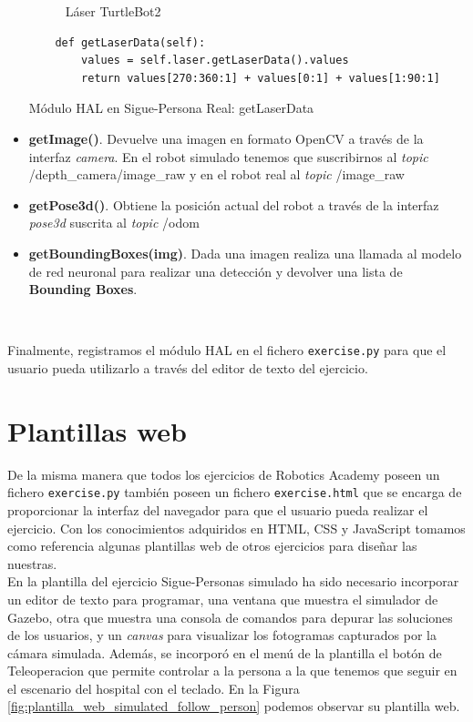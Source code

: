 \begin{itemize}
\begin{figure} [H]
\begin{center}
  \end{center}
  \caption[Láser TurtleBot2]{Láser TurtleBot2}
  \label{fig:vista_planta_turtlebot2}
\end{figure}
\begin{code}[H]
	\begin{lstlisting}
	def getLaserData(self):
		values = self.laser.getLaserData().values
		return values[270:360:1] + values[0:1] + values[1:90:1]
	\end{lstlisting}
	\caption{Módulo HAL en Sigue-Persona Real: getLaserData}
	\label{cod:real_follow_person_hal_laser}
\end{code}
	\item \textbf{getImage()}. Devuelve una imagen en formato OpenCV a través de la interfaz \textit{camera}. En el robot simulado tenemos que suscribirnos al \textit{topic} /depth\_camera/image\_raw y en el robot real al \textit{topic} /image\_raw
	\item \textbf{getPose3d()}. Obtiene la posición actual del robot a través de la interfaz \textit{pose3d} suscrita al \textit{topic} /odom
	\item \textbf{getBoundingBoxes(img)}. Dada una imagen realiza una llamada al modelo de red neuronal para realizar una detección y devolver una lista de \textbf{Bounding Boxes}.  
\end{itemize}\

Finalmente, registramos el módulo HAL en el fichero \texttt{exercise.py} para que el usuario pueda utilizarlo a través del editor de texto del ejercicio.\\

\cleardoublepage

\section{Plantillas web}
\label{subsec:plantillas_web}

De la misma manera que todos los ejercicios de Robotics Academy poseen un fichero \texttt{exercise.py} también poseen un fichero \texttt{exercise.html} que se encarga de proporcionar la interfaz del navegador para que el usuario pueda realizar el ejercicio. Con los conocimientos adquiridos en HTML, CSS y JavaScript tomamos como referencia algunas plantillas web de otros ejercicios para diseñar las nuestras.\\

En la plantilla del ejercicio Sigue-Personas simulado ha sido necesario incorporar un editor de texto para programar, una ventana que muestra el simulador de Gazebo, otra que muestra una consola de comandos para depurar las soluciones de los usuarios, y un \textit{canvas} para visualizar los fotogramas capturados por la cámara simulada. Además, se incorporó en el menú de la plantilla el botón de Teleoperacion que permite controlar a la persona a la que tenemos que seguir en el escenario del hospital con el teclado. En la Figura \ref{fig:plantilla_web_simulated_follow_person} podemos observar su plantilla web.\\

